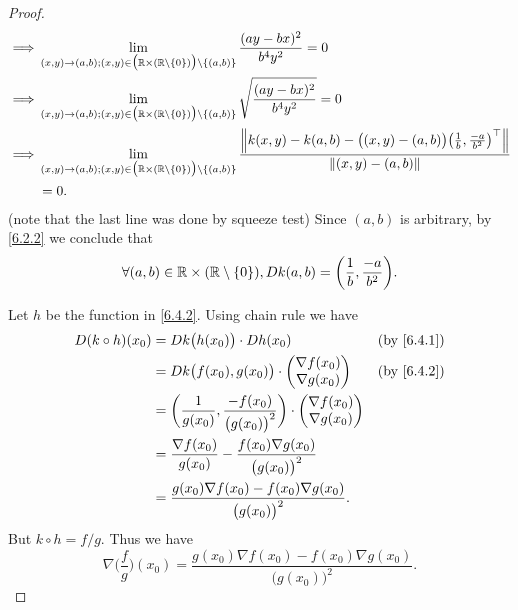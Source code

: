 \begin{proof}
\begin{align*}
    \implies & \lim_{(x, y) \to (a, b) ; (x, y) \in \big(\R \times (\R \setminus \{0\})\big) \setminus \{(a, b)\}} \frac{(ay - bx)^2}{b^4 y^2} = 0                                                                                                  \\
    \implies & \lim_{(x, y) \to (a, b) ; (x, y) \in \big(\R \times (\R \setminus \{0\})\big) \setminus \{(a, b)\}} \sqrt{\frac{(ay - bx)^2}{b^4 y^2}} = 0                                                                                           \\
    \implies & \lim_{(x, y) \to (a, b) ; (x, y) \in \big(\R \times (\R \setminus \{0\})\big) \setminus \{(a, b)\}} \frac{\norm*{k(x, y) - k(a, b) - \big((x, y) - (a, b)\big) \big(\frac{1}{b}, \frac{-a}{b^2}\big)^\top}}{\norm*{(x, y) - (a, b)}} \\
             & = 0.
  \end{align*}
  (note that the last line was done by squeeze test)
  Since \((a, b)\) is arbitrary, by \cref{6.2.2} we conclude that
  \[
    \forall (a, b) \in \R \times (\R \setminus \{0\}), D k(a, b) = \bigg(\frac{1}{b}, \frac{-a}{b^2}\bigg).
  \]

  Let \(h\) be the function in \cref{6.4.2}.
  Using chain rule we have
  \begin{align*}
    D (k \circ h)(x_0) & = D k\big(h(x_0)\big) \cdot D h(x_0)                                                     & \text{(by \cref{6.4.1})} \\
                       & = D k\big(f(x_0), g(x_0)\big) \cdot \begin{pmatrix}
                                                               \nabla f(x_0) \\
                                                               \nabla g(x_0)
                                                             \end{pmatrix}                                      & \text{(by \cref{6.4.2})}   \\
                       & = \bigg(\frac{1}{g(x_0)}, \frac{-f(x_0)}{\big(g(x_0)\big)^2}\bigg) \cdot \begin{pmatrix}
                                                                                                    \nabla f(x_0) \\
                                                                                                    \nabla g(x_0)
                                                                                                  \end{pmatrix}                             \\
                       & = \frac{\nabla f(x_0)}{g(x_0)} - \frac{f(x_0) \nabla g(x_0)}{\big(g(x_0)\big)^2}                                    \\
                       & = \frac{g(x_0) \nabla f(x_0) - f(x_0) \nabla g(x_0)}{\big(g(x_0)\big)^2}.
  \end{align*}
  But \(k \circ h = f / g\).
  Thus we have
  \[
    \nabla \bigg(\frac{f}{g}\bigg)(x_0) = \frac{g(x_0) \nabla f(x_0) - f(x_0) \nabla g(x_0)}{\big(g(x_0)\big)^2}.
  \]
\end{proof}

